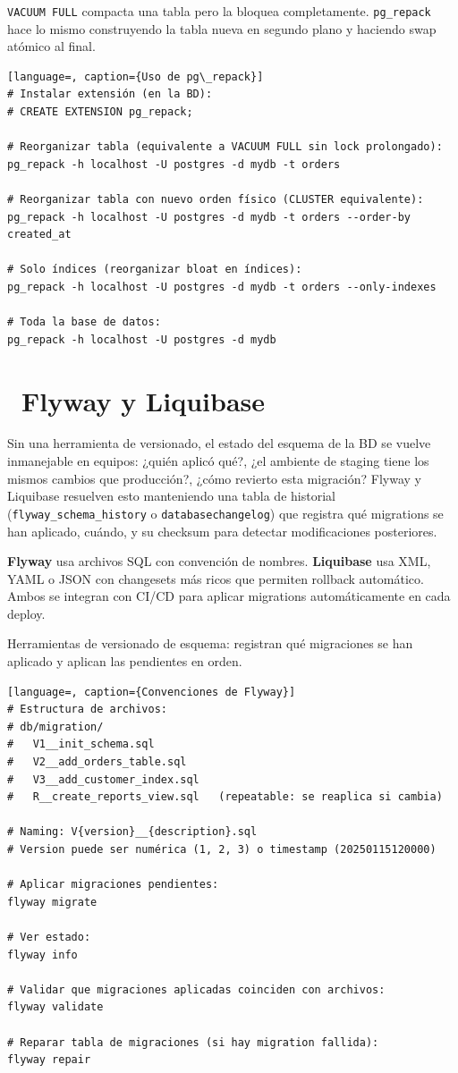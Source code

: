 \texttt{VACUUM FULL} compacta una tabla pero la bloquea completamente.
\texttt{pg\_repack} hace lo mismo construyendo la tabla nueva en segundo plano y haciendo swap atómico al final.

\begin{lstlisting}[language=, caption={Uso de pg\_repack}]
# Instalar extensión (en la BD):
# CREATE EXTENSION pg_repack;

# Reorganizar tabla (equivalente a VACUUM FULL sin lock prolongado):
pg_repack -h localhost -U postgres -d mydb -t orders

# Reorganizar tabla con nuevo orden físico (CLUSTER equivalente):
pg_repack -h localhost -U postgres -d mydb -t orders --order-by created_at

# Solo índices (reorganizar bloat en índices):
pg_repack -h localhost -U postgres -d mydb -t orders --only-indexes

# Toda la base de datos:
pg_repack -h localhost -U postgres -d mydb
\end{lstlisting}

\section[Flyway y Liquibase]{~Flyway y Liquibase}

Sin una herramienta de versionado, el estado del esquema de la BD se vuelve inmanejable en equipos: ¿quién aplicó qué?, ¿el ambiente de staging tiene los mismos cambios que producción?, ¿cómo revierto esta migración?
Flyway y Liquibase resuelven esto manteniendo una tabla de historial (\texttt{flyway\_schema\_history} o \texttt{databasechangelog}) que registra qué migrations se han aplicado, cuándo, y su checksum para detectar modificaciones posteriores.

\textbf{Flyway} usa archivos SQL con convención de nombres.
\textbf{Liquibase} usa XML, YAML o JSON con changesets más ricos que permiten rollback automático.
Ambos se integran con CI/CD para aplicar migrations automáticamente en cada deploy.

Herramientas de versionado de esquema: registran qué migraciones se han aplicado y aplican las pendientes en orden.

\begin{lstlisting}[language=, caption={Convenciones de Flyway}]
# Estructura de archivos:
# db/migration/
#   V1__init_schema.sql
#   V2__add_orders_table.sql
#   V3__add_customer_index.sql
#   R__create_reports_view.sql   (repeatable: se reaplica si cambia)

# Naming: V{version}__{description}.sql
# Version puede ser numérica (1, 2, 3) o timestamp (20250115120000)

# Aplicar migraciones pendientes:
flyway migrate

# Ver estado:
flyway info

# Validar que migraciones aplicadas coinciden con archivos:
flyway validate

# Reparar tabla de migraciones (si hay migration fallida):
flyway repair
\end{lstlisting}

